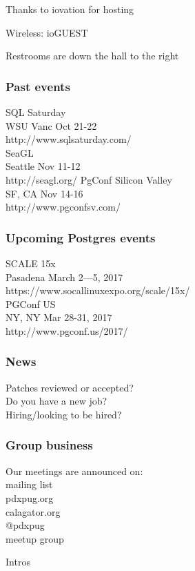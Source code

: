\documentclass{beamer}
\begin{document}

\frame
{
  \begin{center}
  \item[]Thanks to iovation for hosting
  \item[]Wireless: ioGUEST
  \item[]Restrooms are down the hall to the right
  \end{center}
}

\frame
{
  \frametitle{Past events}
  \begin{center}
 {\large SQL Saturday\\}
WSU Vanc Oct 21-22\\
http://www.sqlsaturday.com/\\
  \vspace{5mm}
  {\large SeaGL\\}
Seattle Nov 11-12\\
http://seagl.org/
  \vspace{5mm}
 {\large PgConf Silicon Valley\\}
SF, CA Nov 14-16\\
http://www.pgconfsv.com/\\
  \end{center}
}

\frame
{
  \frametitle{Upcoming Postgres events}
  \begin{center}
 {\large SCALE 15x\\}
Pasadena March 2—5, 2017\\
https://www.socallinuxexpo.org/scale/15x/\\
  \vspace{5mm}
 {\large PGConf US\\}
NY, NY Mar 28-31, 2017\\
http://www.pgconf.us/2017/\\
  \vspace{5mm}
  \end{center}
}

\frame
{
  \frametitle{News}
  \begin{center}
Patches reviewed or accepted?\\
Do you have a new job?\\
Hiring/looking to be hired?\\
  \end{center}
}

\frame
{
  \frametitle{Group business}
  \begin{center}
{\large Our meetings are announced on:\\}
mailing list\\
pdxpug.org\\
calagator.org\\
@pdxpug\\
meetup group\\
\vspace{5mm}
  \end{center}
}

\frame
{
  \begin{center}
{\huge Intros\\}
  \end{center}
}
\end{document}
